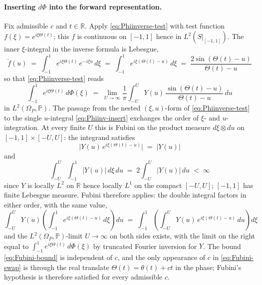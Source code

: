 \documentclass[11pt]{article}
\begin{document}
\paragraph{Inserting $d\Phi$ into the forward representation.} Fix admissible $c$ and $t\in\mathbb{R}$. Apply \eqref{eq:Phiinverse-test} with test function $f(\xi)=e^{i\xi\Theta(t)}$; this $f$ is continuous on $[-1,1]$ hence in $L^2(S|_{[-1,1]})$. The inner $\xi$-integral in the inverse formula is Lebesgue,
\begin{equation}\label{eq:check-f-closed}
\check f(u) \;=\; \int_{-1}^{1}e^{i\xi\Theta(t)}\,e^{-i\xi u}\,d\xi \;=\; \int_{-1}^{1}e^{i\xi(\Theta(t)-u)}\,d\xi \;=\; \frac{2\sin(\Theta(t)-u)}{\Theta(t)-u}
\end{equation}
so that \eqref{eq:Phiinverse-test} reads
\begin{equation}\label{eq:Phiinv-insert}
\int_{-1}^{1}e^{i\xi\Theta(t)}\,d\Phi(\xi) \;=\; \lim_{U\to\infty}\frac{1}{\pi}\int_{-U}^{U}Y(u)\,\frac{\sin(\Theta(t)-u)}{\Theta(t)-u}\,du
\end{equation}
in $L^2(\Omega_P,\mathbb{P})$. The passage from the nested $(\xi,u)$-form of \eqref{eq:Phiinverse-test} to the single $u$-integral \eqref{eq:Phiinv-insert} exchanges the order of $\xi$- and $u$-integration. At every finite $U$ this is Fubini on the product measure $d\xi\otimes du$ on $[-1,1]\times[-U,U]$: the integrand satisfies
\begin{equation}\label{eq:Fubini-bound}
\bigl|Y(u)\,e^{i\xi(\Theta(t)-u)}\bigr| \;=\; |Y(u)|
\end{equation}
and
\begin{equation}\label{eq:Fubini-L1}
\int_{-U}^{U}\!\int_{-1}^{1}|Y(u)|\,d\xi\,du \;=\; 2\int_{-U}^{U}|Y(u)|\,du \;<\; \infty
\end{equation}
since $Y$ is locally $L^2$ on $\mathbb{R}$ hence locally $L^1$ on the compact $[-U,U]$; $[-1,1]$ has finite Lebesgue measure. Fubini therefore applies: the double integral factors in either order, with the same value,
\begin{equation}\label{eq:Fubini-swap}
\int_{-U}^{U}Y(u)\!\left(\int_{-1}^{1}e^{i\xi(\Theta(t)-u)}\,d\xi\right)\!du \;=\; \int_{-1}^{1}\!\left(\int_{-U}^{U}Y(u)\,e^{i\xi(\Theta(t)-u)}\,du\right)\!d\xi
\end{equation}
and the $L^2(\Omega_P,\mathbb{P})$-limit $U\to\infty$ on both sides exists, with the limit on the right equal to $\int_{-1}^{1}e^{i\xi\Theta(t)}\,d\Phi(\xi)$ by truncated Fourier inversion for $Y$. The bound \eqref{eq:Fubini-bound} is independent of $c$, and the only appearance of $c$ in \eqref{eq:Fubini-swap} is through the real translate $\Theta(t)=\theta(t)+ct$ in the phase; Fubini's hypothesis is therefore satisfied for every admissible $c$.
\end{document}
